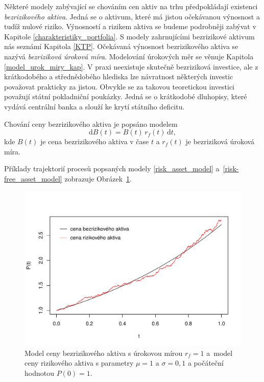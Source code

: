 \documentclass[a4paper,12pt]{report}
\theoremstyle{definition} \newtheorem{definice}[veta]{Definice}
\theoremstyle{remark}
\begin{document}
Některé modely zabývající se chováním cen aktiv na trhu předpokládají existenci \textit{bezrizikového aktiva}.
Jedná se o aktivum, které má jistou očekávanou výnosnost a tudíž nulové riziko.
Výnosností a rizikem aktiva se budeme podrobněji zabývat v Kapitole \ref{charakteristiky_portfolia}. 
S modely zahrnujícími bezrizikové aktivum nás seznámí Kapitola \ref{KTP}.
Očekávaná výnosnost bezrizikového aktiva se nazývá \textit{bezriziková úroková míra}.
Modelování úrokových měr se věnuje Kapitola \ref{model_urok_miry_kap}.
V praxi neexistuje skutečně bezriziková investice, ale z krátkodobého a střednědobého hlediska lze návratnost některých investic považovat prakticky za jistou.
Obvykle se za takovou teoretickou investici považují státní pokladniční poukázky.
Jedná se o krátkodobé dluhopisy, které vydává centrální banka a slouží ke krytí státního deficitu.

Chování ceny bezrizikového aktiva je popsáno modelem
\begin{equation}\label{risk-free_asset_model}
\mathrm{d}B(t)=B(t)\,r_f(t)\,\mathrm{d}t,
\end{equation}
kde $B(t)$ je cena bezrizikového aktiva v čase $t$ a $r_f(t)$ je bezriziková úroková míra.

Příklady trajektorií procesů popsaných modely \eqref{risk_asset_model} a~\eqref{risk-free_asset_model} zobrazuje Obrázek~\ref{asset_model_graf}.

\begin{figure}[!htbp]
  \centering 
	\includegraphics[width=13.5cm, clip, trim= 0 15 25 50]{IMG/GWP_RFA_v5.pdf}
  \caption{Model ceny bezrizikového aktiva s úrokovou mírou $r_f=1$ a~model ceny rizikového aktiva s parametry $\mu=1$ a  $\sigma=0,1$ a počáteční hodnotou $P(0)=1$.}  \label{asset_model_graf}
\end{figure}
\end{document}
